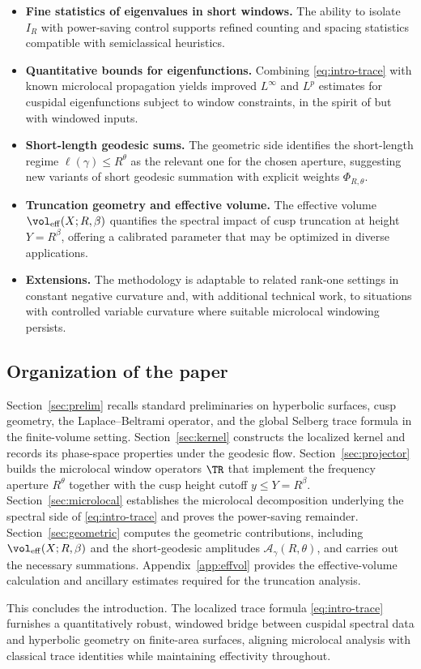 \begin{itemize}
  \item \textbf{Fine statistics of eigenvalues in short windows.} The ability to isolate $I_R$ with power-saving control supports refined counting and spacing statistics compatible with semiclassical heuristics.
  \item \textbf{Quantitative bounds for eigenfunctions.} Combining \eqref{eq:intro-trace} with known microlocal propagation yields improved $L^\infty$ and $L^p$ estimates for cuspidal eigenfunctions subject to window constraints, in the spirit of \cite{iwaniec1995} but with windowed inputs.
  \item \textbf{Short-length geodesic sums.} The geometric side identifies the short-length regime $\ell(\gamma)\le R^\theta$ as the relevant one for the chosen aperture, suggesting new variants of short geodesic summation with explicit weights $\Phi_{R,\theta}$.
  \item \textbf{Truncation geometry and effective volume.} The effective volume $\vol_{\mathrm{eff}}(X;R,\beta)$ quantifies the spectral impact of cusp truncation at height $Y=R^\beta$, offering a calibrated parameter that may be optimized in diverse applications.
  \item \textbf{Extensions.} The methodology is adaptable to related rank-one settings in constant negative curvature and, with additional technical work, to situations with controlled variable curvature where suitable microlocal windowing persists.
\end{itemize}

\subsection{Organization of the paper}

Section~\ref{sec:prelim} recalls standard preliminaries on hyperbolic surfaces, cusp geometry, the Laplace--Beltrami operator, and the global Selberg trace formula in the finite-volume setting. Section~\ref{sec:kernel} constructs the localized kernel and records its phase-space properties under the geodesic flow. Section~\ref{sec:projector} builds the microlocal window operators $\TR$ that implement the frequency aperture $R^\theta$ together with the cusp height cutoff $y\le Y=R^\beta$. Section~\ref{sec:microlocal} establishes the microlocal decomposition underlying the spectral side of \eqref{eq:intro-trace} and proves the power-saving remainder. Section~\ref{sec:geometric} computes the geometric contributions, including $\vol_{\mathrm{eff}}(X;R,\beta)$ and the short-geodesic amplitudes $\mathcal{A}_\gamma(R,\theta)$, and carries out the necessary summations. Appendix~\ref{app:effvol} provides the effective-volume calculation and ancillary estimates required for the truncation analysis.

This concludes the introduction. The localized trace formula \eqref{eq:intro-trace} furnishes a quantitatively robust, windowed bridge between cuspidal spectral data and hyperbolic geometry on finite-area surfaces, aligning microlocal analysis with classical trace identities while maintaining effectivity throughout.

